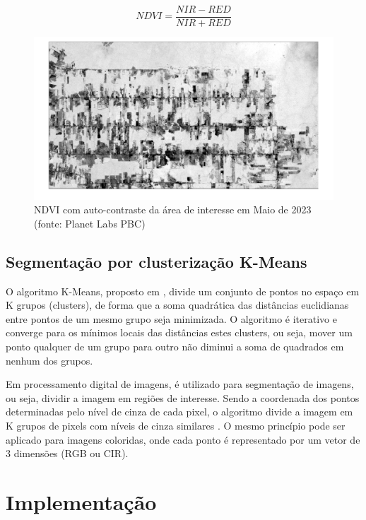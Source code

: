 \documentclass[11pt]{article}
\begin{document}
\begin{equation} \label{eq:ndvi}
	NDVI = \frac{NIR - RED}{NIR + RED}
\end{equation}

\begin{figure}[!htb]
	\centering
	\includegraphics[width=.9\textwidth]{candeias_maio_2023_ndvi.png}
	\caption{NDVI com auto-contraste da área de interesse em Maio de 2023 (fonte: Planet Labs PBC)}
	\label{fig:candeias_maio_2023_ndvi}
\end{figure}

\subsection{Segmentação por clusterização K-Means}
\label{ss:kmeans}

O algoritmo K-Means, proposto em \cite{kmeans:1979}, divide um conjunto de pontos no espaço em K grupos (clusters), de forma que a soma quadrática das distâncias euclidianas entre pontos de um mesmo grupo seja minimizada. O algoritmo é iterativo e converge para os mínimos locais das distâncias estes clusters, ou seja, mover um ponto qualquer de um grupo para outro não diminui a soma de quadrados em nenhum dos grupos.

Em processamento digital de imagens, é utilizado para segmentação de imagens, ou seja, dividir a imagem em regiões de interesse. Sendo a coordenada dos pontos determinadas pelo nível de cinza de cada pixel, o algoritmo divide a imagem em K grupos de pixels com níveis de cinza similares \cite{dhanachandra:2015}. O mesmo princípio pode ser aplicado para imagens coloridas, onde cada ponto é representado por um vetor de 3 dimensões (RGB ou CIR).







\section{Implementação}
\end{document}
